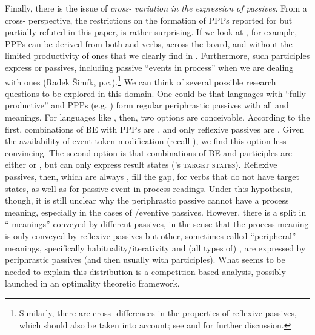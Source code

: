 \documentclass[output=paper,modfonts,newtxmath,hidelinks]{langscibook}
\begin{document}
Finally, there is the issue of \textit{cross- variation in the expression of passives}. From a cross- perspective, the  restrictions on the formation of PPPs reported for  but partially refuted in this paper, is rather surprising. If we look at , for example, PPPs can be derived from both  and  verbs, across the board, and without the limited productivity of  ones that we clearly find in . Furthermore, such participles express  or  passives, including passive ``events in process'' when we are dealing with  ones (Radek Šimík, p.c.).\footnote{Similarly, there are cross- differences in the properties of reflexive passives, which should also be taken into account; see \citet{fehrmann+10} and \citet{schaefer16} for further discussion.} We can think of several possible research questions to be explored in this domain. One could be that languages with ``fully productive''  and  PPPs (e.g. ) form regular periphrastic  passives with all  and  meanings. For languages like , then, two options are conceivable. According to the first, combinations of BE with PPPs are , and only reflexive passives are . Given the availability of event token modification (recall ), we find this option less convincing. The second option is that combinations of BE and  participles are either  or , but can only express result states (\citeauthor{kratzer00}'s \citeyear{kratzer00} \textsc{target states}). Reflexive passives, then, which are always , fill the gap, for verbs that do not have target states, as well as for passive event-in-process readings. Under this hypothesis, though, it is still unclear why the  periphrastic passive cannot have a process meaning, especially in the cases of /eventive passives. However, there is a split in `` meanings'' conveyed by different passives, in the sense that the process meaning is only conveyed by reflexive passives but other, sometimes called ``peripheral''  meanings, specifically habituality/iterativity and (all types of) , are expressed by periphrastic passives (and then usually with  participles). What seems to be needed to explain this distribution is a competition-based analysis, possibly launched in an optimality theoretic framework. 
 
\end{document}
